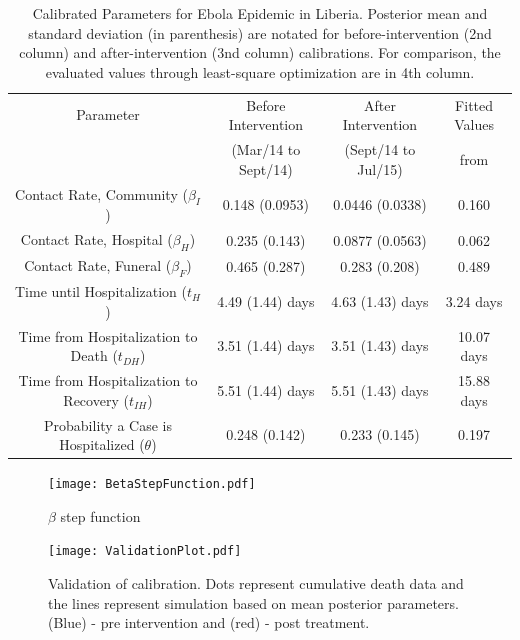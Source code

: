 \begin{table}[ht]
\caption{Calibrated Parameters for Ebola Epidemic in Liberia. Posterior mean and standard deviation (in parenthesis) are notated for before-intervention (2nd column) and after-intervention (3nd column) calibrations. For comparison, the evaluated values through least-square optimization \cite{Rivers2014} are in 4th column.} %
\centering %
\begin{tabular}{c c c c}
\hline\hline %
Parameter &  Before Intervention  & After Intervention & Fitted Values\\ [0.5ex]
 & (Mar/14 to Sept/14) &  (Sept/14 to Jul/15) & from \cite{Rivers2014}\\ [0.5ex] %
\hline %
{Contact Rate, Community  (${\beta_{I}}$) }& {0.148 (0.0953)} & {0.0446 (0.0338)} & 0.160 \\
Contact Rate, Hospital  ($\beta_{H}$) & 0.235 (0.143) & 0.0877 (0.0563) & 0.062\\
Contact Rate, Funeral  ($\beta_{F}$) & 0.465 (0.287)& 0.283 (0.208) & 0.489 \\
Time until Hospitalization (${t_{H}}$) & 4.49 (1.44) days & 4.63 (1.43) days & 3.24 days  \\
Time from Hospitalization to Death (${t_{DH}}$) & 3.51 (1.44) days & 3.51 (1.43) days  & 10.07 days\\
Time from Hospitalization to Recovery (${t_{IH}}$) & 5.51 (1.44) days & 5.51 (1.43) days  & 15.88 days\\
Probability a Case is Hospitalized ($\theta$) & 0.248 (0.142) & 0.233 (0.145) & 0.197\\
[1ex]
\hline
\end{tabular}
\label{tab:calibratedParameters}
\end{table}



\begin{figure}[!h]
  \centering
  \texttt{[image: BetaStepFunction.pdf]}
  \caption{$\beta$ step function} 
\label{fig:BetaStepFunction} 
\end{figure}


\begin{figure}[h]
  \centering
  \texttt{[image: ValidationPlot.pdf]}
  \caption{Validation of calibration. Dots represent cumulative death data and the lines represent simulation based on mean posterior parameters. (Blue) - pre intervention and (red) - post treatment.}
\label{fig:Cumulative _Death}
\end{figure}






